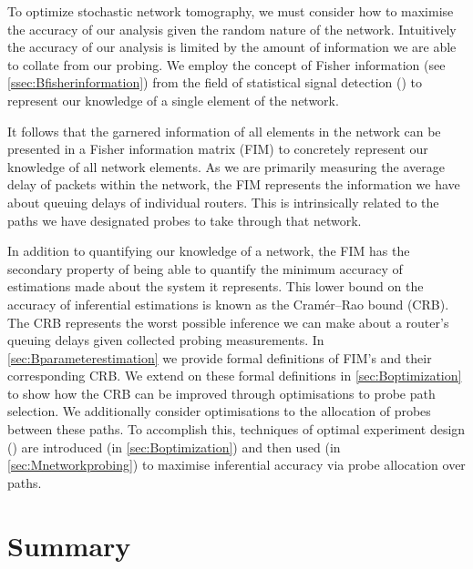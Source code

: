 To optimize stochastic network tomography, we must consider how to maximise the accuracy of our analysis given the random nature of the network. Intuitively the accuracy of our analysis is limited by the amount of information we are able to collate from our probing. We employ the concept of Fisher information (see \cref{ssec:Bfisherinformation}) from the field of statistical signal detection (\cite{poor_introduction_1994}) to represent our knowledge of a single element of the network.\par
It follows that the garnered information of all elements in the network can be presented in a Fisher information matrix (FIM) to concretely represent our knowledge of all network elements. As we are primarily measuring the average delay of packets within the network, the FIM represents the information we have about queuing delays of individual routers. This is intrinsically related to the paths we have designated probes to take through that network.\par
In addition to quantifying our knowledge of a network, the FIM has the secondary property of being able to quantify the minimum accuracy of estimations made about the system it represents. This lower bound on the accuracy of inferential estimations is known as the Cramér–Rao bound (CRB). The CRB represents the worst possible inference we can make about a router's queuing delays given collected probing measurements. In \cref{sec:Bparameterestimation} we provide formal definitions of FIM's and their corresponding CRB. We extend on these formal definitions in \cref{sec:Boptimization} to show how the CRB can be improved through optimisations to probe path selection. We additionally consider optimisations to the allocation of probes between these paths. To accomplish this, techniques of optimal experiment design (\cite{anthony_c_optimum_1996}) are introduced (in \cref{sec:Boptimization}) and then used (in \cref{sec:Mnetworkprobing}) to maximise inferential accuracy via probe allocation over paths.\par

\section{Summary}
\label{sec:Iintroductionsummary}

